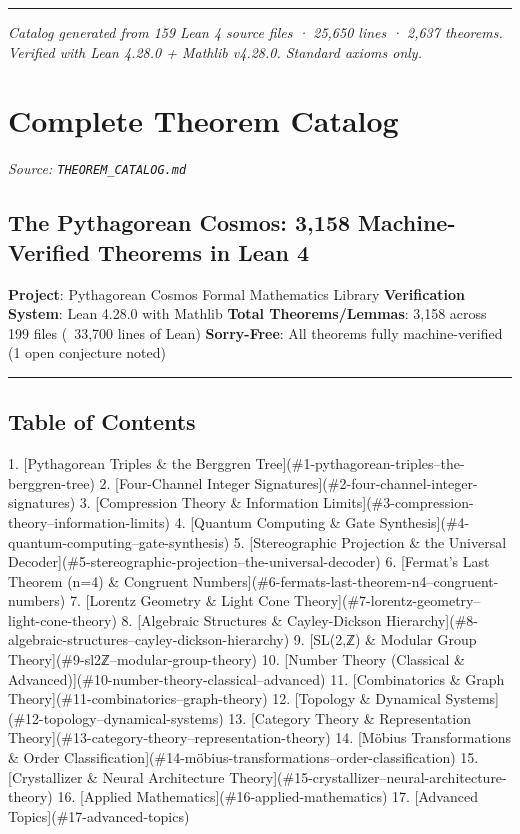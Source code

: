 \documentclass[12pt,a4paper,openany]{book}
\begin{document}
\bigskip\hrule\bigskip

\textit{Catalog generated from 159 Lean 4 source files · 25,650 lines · 2,637 theorems.}
\textit{Verified with Lean 4.28.0 + Mathlib v4.28.0. Standard axioms only.}

\clearpage

\chapter{Complete Theorem Catalog}
\textit{Source: \texttt{THEOREM\_CATALOG.md}}


\section{The Pythagorean Cosmos: 3,158 Machine-Verified Theorems in Lean 4}

\textbf{Project}: Pythagorean Cosmos Formal Mathematics Library  
\textbf{Verification System}: Lean 4.28.0 with Mathlib  
\textbf{Total Theorems/Lemmas}: 3,158 across 199 files (~33,700 lines of Lean)  
\textbf{Sorry-Free}: All theorems fully machine-verified (1 open conjecture noted)  

\bigskip\hrule\bigskip

\section{Table of Contents}

1. [Pythagorean Triples \& the Berggren Tree](\#1-pythagorean-triples--the-berggren-tree)
2. [Four-Channel Integer Signatures](\#2-four-channel-integer-signatures)
3. [Compression Theory \& Information Limits](\#3-compression-theory--information-limits)
4. [Quantum Computing \& Gate Synthesis](\#4-quantum-computing--gate-synthesis)
5. [Stereographic Projection \& the Universal Decoder](\#5-stereographic-projection--the-universal-decoder)
6. [Fermat's Last Theorem (n=4) \& Congruent Numbers](\#6-fermats-last-theorem-n4--congruent-numbers)
7. [Lorentz Geometry \& Light Cone Theory](\#7-lorentz-geometry--light-cone-theory)
8. [Algebraic Structures \& Cayley-Dickson Hierarchy](\#8-algebraic-structures--cayley-dickson-hierarchy)
9. [SL(2,ℤ) \& Modular Group Theory](\#9-sl2ℤ--modular-group-theory)
10. [Number Theory (Classical \& Advanced)](\#10-number-theory-classical--advanced)
11. [Combinatorics \& Graph Theory](\#11-combinatorics--graph-theory)
12. [Topology \& Dynamical Systems](\#12-topology--dynamical-systems)
13. [Category Theory \& Representation Theory](\#13-category-theory--representation-theory)
14. [Möbius Transformations \& Order Classification](\#14-möbius-transformations--order-classification)
15. [Crystallizer \& Neural Architecture Theory](\#15-crystallizer--neural-architecture-theory)
16. [Applied Mathematics](\#16-applied-mathematics)
17. [Advanced Topics](\#17-advanced-topics)
\end{document}
